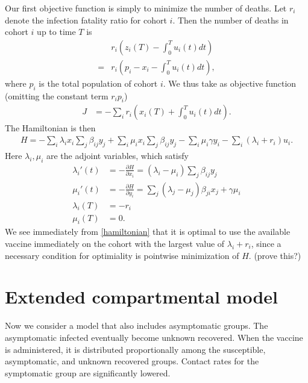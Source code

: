 \documentclass[english,12pt,letter]{article}
\begin{document}
Our first objective function is simply to minimize the number of deaths.  Let
$r_i$ denote the infection fatality ratio for cohort $i$.
Then the number of deaths in cohort $i$ up to time $T$ is
\begin{align}
 &  r_i \left(z_i(T) - \int_0^T u_i(t) dt\right) \\
 = & r_i\left(p_i-x_i - \int_0^T u_i(t) dt\right),
\end{align}
where $p_i$ is the total population of cohort $i$.
We thus take as objective function (omitting the constant term $r_i p_i$)
\begin{align}
    J & = - \sum_i r_i \left( x_i(T) + \int_0^T u_i(t) dt\right).
\end{align}
The Hamiltonian is then
\begin{align} \label{hamiltonian}
    H = - \sum_i \lambda_i x_i \sum_j \beta_{ij} y_j + \sum_i \mu_i x_i \sum_j \beta_{ij} y_j 
            - \sum_i \mu_i \gamma y_i - \sum_i (\lambda_i + r_i) u_i.
\end{align}
Here $\lambda_i, \mu_i$ are the adjoint variables, which satisfy
\begin{align}
    \lambda_i'(t) & = -\frac{\partial H}{\partial x_i} = (\lambda_i - \mu_i) \sum_j \beta_{ij} y_j \\
    \mu_i'(t) & = -\frac{\partial H}{\partial y_i} = \sum_j (\lambda_j - \mu_j) \beta_{ji} x_j + \gamma \mu_i \\
    \lambda_i(T) & = - r_i \\
    \mu_i(T) & = 0.
\end{align}
We see immediately from \eqref{hamiltonian} that it is optimal to use the available
vaccine immediately on the cohort with the largest value of $\lambda_i + r_i$,
since a necessary condition for optimiality is pointwise minimization of $H$.
(prove this?)


\section{Extended compartmental model}
Now we consider a model that also includes asymptomatic groups.  The asymptomatic
infected eventually become unknown recovered.
When the vaccine is administered, it is distributed proportionally among the susceptible,
asymptomatic, and unknown recovered groups.  Contact rates for the symptomatic
group are significantly lowered.
\end{document}
